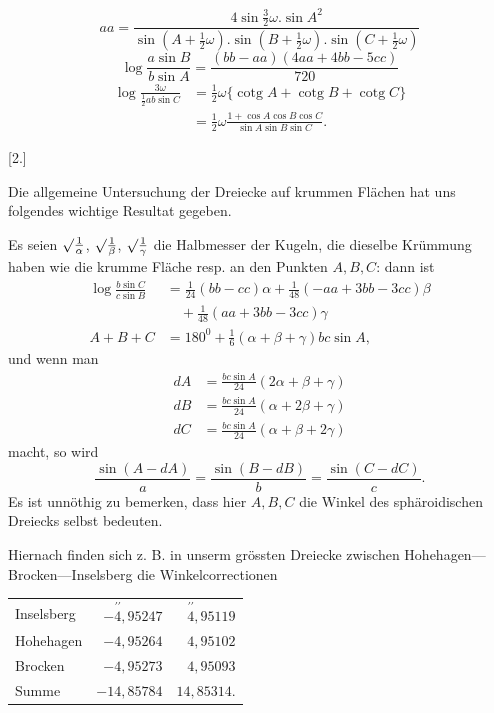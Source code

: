 %
\[
aa=\frac{4\sin\frac32\omega.\sin A^2}{\sin(A+\frac12\omega).\sin(B+\frac12\omega).\sin(C+\frac12\omega)}
\]
\[
\log\frac{a\sin B}{b\sin A}=\frac{(bb-aa)(4aa+4bb-5cc)}{720}
\]
\[
\begin{aligned}
\log\frac{3\omega}{\frac12 ab\sin C}&=\tfrac12\omega\{\operatorname{cotg}A+\operatorname{cotg}B+\operatorname{cotg}C\}\\
&=\tfrac12\omega\frac{1+\cos A\cos B\cos C}{\sin A\sin B\sin C}.
\end{aligned}
\]
\par{}\begin{center}[2.]\end{center}
\noindent\hspace*{1.2em}Die allgemeine Untersuchung der Dreiecke auf krummen Flächen hat uns folgendes wichtige Resultat gegeben.

Es seien $\mathord{\surd}\frac1\alpha$, $\mathord{\surd}\frac1\beta$, $\mathord{\surd}\frac1\gamma$ die Halbmesser der Kugeln, die dieselbe Krümmung haben wie die krumme Fläche resp. an den Punkten $A,B,C$: dann ist
\[
\begin{aligned}
\log\frac{b\sin C}{c\sin B}&=\tfrac1{24}(bb-cc)\alpha+\tfrac1{48}(-aa+3bb-3cc)\beta\\
&\quad+\tfrac1{48}(aa+3bb-3cc)\gamma\\
A+B+C&=180^0+\tfrac16(\alpha+\beta+\gamma)bc\sin A,
\end{aligned}
\]
\noindent und wenn man
\[
\begin{aligned}
dA&=\frac{bc\sin A}{24}(2\alpha+\beta+\gamma)\\
dB&=\frac{bc\sin A}{24}(\alpha+2\beta+\gamma)\\
dC&=\frac{bc\sin A}{24}(\alpha+\beta+2\gamma)
\end{aligned}
\]
\noindent macht, so wird
\[
\frac{\sin(A-dA)}a=\frac{\sin(B-dB)}b=\frac{\sin(C-dC)}c.
\]
\indent Es ist unnöthig zu bemerken, dass hier $A,B,C$ die Winkel des sphäroidischen Dreiecks selbst bedeuten.

Hiernach finden sich z. B. in unserm grössten Dreiecke zwischen Hohe\-hagen---Brocken---Inselsberg die Winkelcorrectionen
\begin{center}\begin{tabular}{lrr}
Inselsberg & $-\overset{\prime\prime}{4}{,}95247$ & $\overset{\prime\prime}{4}{,}95119$\\
Hohehagen & $-4{,}95264$ & $4{,}95102$\\
Brocken & $-4{,}95273$ & $4{,}95093$\\
Summe & $-14{,}85784$ & $14{,}85314.$
\end{tabular}\end{center}
